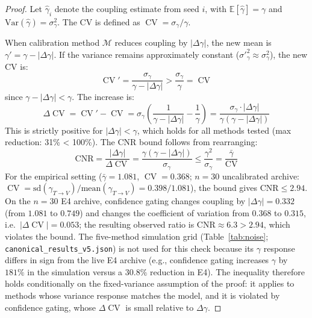 \documentclass[11pt]{article}
\DeclareMathOperator{\CV}{CV}
\begin{document}
\begin{proof}
Let $\hat{\gamma}_i$ denote the coupling estimate from seed $i$, with $\mathbb{E}[\hat{\gamma}] = \gamma$ and $\text{Var}(\hat{\gamma}) = \sigma^2_{\gamma}$. The CV is defined as $\CV = \sigma_{\gamma} / \gamma$.

When calibration method $\mathcal{M}$ reduces coupling by $|\Delta\gamma|$, the new mean is $\gamma' = \gamma - |\Delta\gamma|$. If the variance remains approximately constant ($\sigma'^2_{\gamma} \approx \sigma^2_{\gamma}$), the new CV is:
\begin{equation}
    \CV' = \frac{\sigma_{\gamma}}{\gamma - |\Delta\gamma|} > \frac{\sigma_{\gamma}}{\gamma} = \CV
\end{equation}
since $\gamma - |\Delta\gamma| < \gamma$. The increase is:
\begin{equation}
    \Delta\CV = \CV' - \CV = \sigma_{\gamma} \left(\frac{1}{\gamma - |\Delta\gamma|} - \frac{1}{\gamma}\right) = \frac{\sigma_{\gamma} \cdot |\Delta\gamma|}{\gamma(\gamma - |\Delta\gamma|)}
\end{equation}
This is strictly positive for $|\Delta\gamma| < \gamma$, which holds for all methods tested (max reduction: 31\% < 100\%). The CNR bound follows from rearranging:
\begin{equation}
    \text{CNR} = \frac{|\Delta\gamma|}{\Delta\CV} = \frac{\gamma(\gamma - |\Delta\gamma|)}{\sigma_{\gamma}} \leq \frac{\gamma^2}{\sigma_{\gamma}} = \frac{\bar{\gamma}}{\CV}
\end{equation}
For the empirical setting ($\bar{\gamma} = 1.081$, $\CV = 0.368$; $n{=}30$ uncalibrated archive: $\CV = \mathrm{sd}(\gamma_{T\to V})/\mathrm{mean}(\gamma_{T\to V}) = 0.398/1.081$), the bound gives $\text{CNR} \leq 2.94$. On the $n{=}30$ E4 archive, confidence gating changes coupling by $|\Delta\gamma| = 0.332$ (from $1.081$ to $0.749$) and changes the coefficient of variation from $0.368$ to $0.315$, i.e.\ $|\Delta\CV| = 0.053$; the resulting observed ratio is $\text{CNR} \approx 6.3 > 2.94$, which violates the bound. The five-method simulation grid (Table~\ref{tab:noise}; \texttt{canonical\_results\_v5.json}) is not used for this check because its $\gamma$ response differs in sign from the live E4 archive (e.g., confidence gating increases $\gamma$ by $181\%$ in the simulation versus a $30.8\%$ reduction in E4). The inequality therefore holds conditionally on the fixed-variance assumption of the proof: it applies to methods whose variance response matches the model, and it is violated by confidence gating, whose $\Delta\CV$ is small relative to $\Delta\gamma$.
\end{proof}
\end{document}
